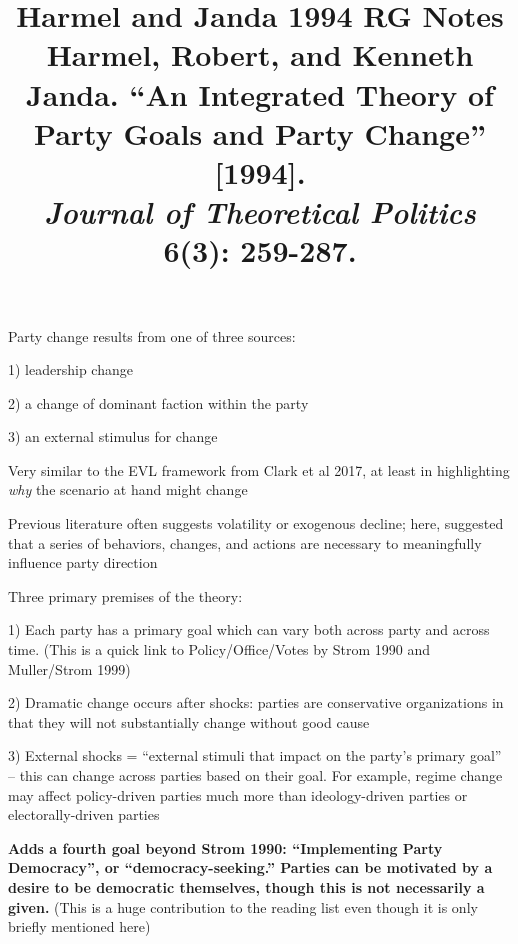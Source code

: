 \documentclass[12pt]{article}
\title{\textbf{Harmel and Janda 1994 RG Notes}\\
\large Harmel, Robert, and Kenneth Janda. ``An Integrated Theory of Party Goals and Party Change'' [1994].\\
\textit{Journal of Theoretical Politics} 6(3): 259-287.}
\author{}
\date{}
\begin{document}
\maketitle

Party change results from one of three sources:

1) leadership change

2) a change of dominant faction within the party

3) an external stimulus for change

Very similar to the EVL framework from Clark et al 2017, at least in highlighting \textit{why} the scenario at hand might change

Previous literature often suggests volatility or exogenous decline; here, suggested that a series of behaviors, changes, and actions are necessary to meaningfully influence party direction

Three primary premises of the theory:

1) Each party has a primary goal which can vary both across party and across time. (This is a quick link to Policy/Office/Votes by Strom 1990 and Muller/Strom 1999)

2) Dramatic change occurs after shocks: parties are conservative organizations in that they will not substantially change without good cause

3) External shocks = ``external stimuli that impact on the party's primary goal'' -- this can change across parties based on their goal. For example, regime change may affect policy-driven parties much more than ideology-driven parties or electorally-driven parties

\textbf{Adds a fourth goal beyond Strom 1990: ``Implementing Party Democracy'', or ``democracy-seeking.'' Parties can be motivated by a desire to be democratic themselves, though this is not necessarily a given.} (This is a huge contribution to the reading list even though it is only briefly mentioned here)
\end{document}
